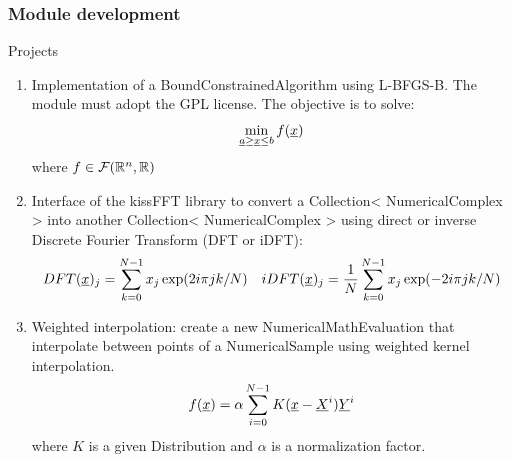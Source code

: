 \documentclass[8pt]{beamer}
\begin{document}
\begin{frame}
  \frametitle{Module development}
  \begin{block}{Projects}
    \begin{enumerate}
      \item Implementation of a BoundConstrainedAlgorithm using L-BFGS-B. The module must adopt the GPL license. The objective is to solve:
        \begin{equation}
          \min_{{\underline{a}}\geq{\underline{x}}\leq{b}}f({\underline{x}})
        \end{equation}
        where $f\in\mathcal{F}({\mathbb R}^n,{\mathbb R})$
      \item Interface of the kissFFT library to convert a Collection< NumericalComplex > into another Collection< NumericalComplex > using direct or inverse Discrete Fourier Transform (DFT or iDFT):
        \begin{equation}
          DFT({\underline{x}})_j=\sum_{k=0}^{N-1}x_j\exp(2i\pi jk/N)\quad iDFT({\underline{x}})_j=\frac{1}{N}\sum_{k=0}^{N-1}x_j\exp(-2i\pi jk/N)
        \end{equation}
      \item Weighted interpolation: create a new NumericalMathEvaluation that interpolate between points of a NumericalSample using weighted kernel interpolation.
        \begin{equation}
          f({\underline{x}})=\alpha\sum_{i=0}^{N-1}K({\underline{x}}-{\underline{X}}^i){\underline{Y}}^i
        \end{equation}
where $K$ is a given Distribution and $\alpha$ is a normalization factor.
    \end{enumerate}
  \end{block}
\end{frame}
\end{document}
